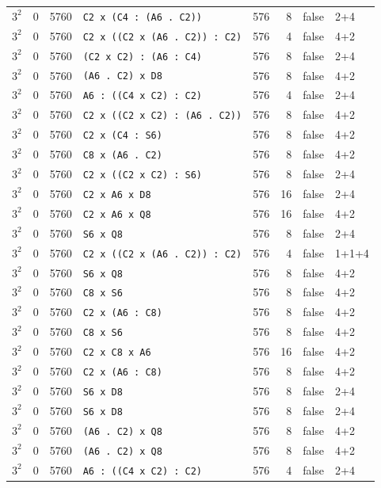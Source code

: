 \begin{longtable}{llrlrrll}
$3^2$ & 0 & 5760 & \texttt{C2 x (C4 : (A6 . C2))} & 576 & 8 & false & 2+4\\
$3^2$ & 0 & 5760 & \texttt{C2 x ((C2 x (A6 . C2)) : C2)} & 576 & 4 & false & 4+2\\
$3^2$ & 0 & 5760 & \texttt{(C2 x C2) : (A6 : C4)} & 576 & 8 & false & 2+4\\
$3^2$ & 0 & 5760 & \texttt{(A6 . C2) x D8} & 576 & 8 & false & 4+2\\
$3^2$ & 0 & 5760 & \texttt{A6 : ((C4 x C2) : C2)} & 576 & 4 & false & 2+4\\
$3^2$ & 0 & 5760 & \texttt{C2 x ((C2 x C2) : (A6 . C2))} & 576 & 8 & false & 4+2\\
$3^2$ & 0 & 5760 & \texttt{C2 x (C4 : S6)} & 576 & 8 & false & 4+2\\
$3^2$ & 0 & 5760 & \texttt{C8 x (A6 . C2)} & 576 & 8 & false & 4+2\\
$3^2$ & 0 & 5760 & \texttt{C2 x ((C2 x C2) : S6)} & 576 & 8 & false & 2+4\\
$3^2$ & 0 & 5760 & \texttt{C2 x A6 x D8} & 576 & 16 & false & 2+4\\
$3^2$ & 0 & 5760 & \texttt{C2 x A6 x Q8} & 576 & 16 & false & 4+2\\
$3^2$ & 0 & 5760 & \texttt{S6 x Q8} & 576 & 8 & false & 2+4\\
$3^2$ & 0 & 5760 & \texttt{C2 x ((C2 x (A6 . C2)) : C2)} & 576 & 4 & false & 1+1+4\\
$3^2$ & 0 & 5760 & \texttt{S6 x Q8} & 576 & 8 & false & 4+2\\
$3^2$ & 0 & 5760 & \texttt{C8 x S6} & 576 & 8 & false & 4+2\\
$3^2$ & 0 & 5760 & \texttt{C2 x (A6 : C8)} & 576 & 8 & false & 4+2\\
$3^2$ & 0 & 5760 & \texttt{C8 x S6} & 576 & 8 & false & 4+2\\
$3^2$ & 0 & 5760 & \texttt{C2 x C8 x A6} & 576 & 16 & false & 4+2\\
$3^2$ & 0 & 5760 & \texttt{C2 x (A6 : C8)} & 576 & 8 & false & 4+2\\
$3^2$ & 0 & 5760 & \texttt{S6 x D8} & 576 & 8 & false & 2+4\\
$3^2$ & 0 & 5760 & \texttt{S6 x D8} & 576 & 8 & false & 2+4\\
$3^2$ & 0 & 5760 & \texttt{(A6 . C2) x Q8} & 576 & 8 & false & 4+2\\
$3^2$ & 0 & 5760 & \texttt{(A6 . C2) x Q8} & 576 & 8 & false & 4+2\\
$3^2$ & 0 & 5760 & \texttt{A6 : ((C4 x C2) : C2)} & 576 & 4 & false & 2+4\\

\end{longtable}
